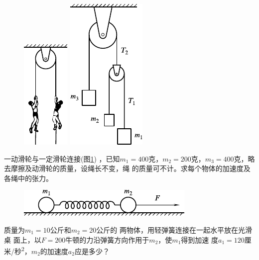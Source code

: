 \begin{exercises}
\begin{figure}[h]
  \begin{minipage}[b]{0.4\linewidth}
    \centering
    \includegraphics{figure/fig03.30}
    \caption{}
    \label{fig:03.30}
  \end{minipage}
  \begin{minipage}[b]{0.6\linewidth}
    \centering
    \includegraphics{figure/fig03.31}
    \caption{}
    \label{fig:03.31}
  \end{minipage}
  \vspace{-1.56em}
\end{figure}
\exercise 一动滑轮与一定滑轮连接(图\ref{fig:03.31}) ，已知$ m _ { 1 } = 4 0 0 $克，$ m _ { 2 } = 2 0 0 $克，$ m _ { 3 } = 4 0 0 $克，略去摩擦及动滑轮的质量，设绳长不变，绳
的质量可不计。求每个物体的加速度及各绳中的张力。

\begin{figure}
  \centering
  \includegraphics{figure/fig03.32}
  \caption{}
  \label{fig:03.32}
\end{figure}
\exercise 质量为$ m _ { 1 } = 1 0 $公斤和$ m _ { 2 } = 2 0 $公斤的
两物体，用轻弹簧连接在一起水平放在光滑桌
面上，以$ F = 2 0 0 $牛顿的力沿弹簧方向作用于$ m _ { 2 } $，使$ m _ { 1 } $得到加速
度$ a _ { 1 } = 1 2 0 $厘米/秒\textsuperscript{2}，$ m _ { 2 } $的加速度$ a _ { 2 } $应是多少？


\end{exercises}
